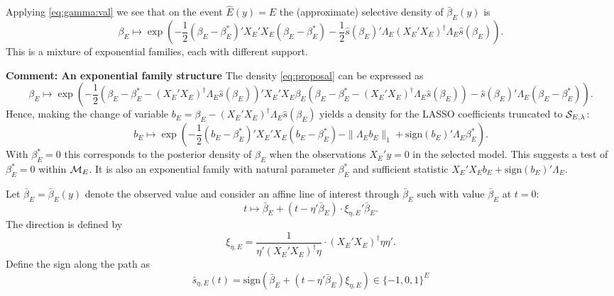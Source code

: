 \documentclass{article}
\newcommand{\OLS}{\bar{\beta}}
\begin{document}
        Applying \eqref{eq:gamma:val} we see that on
        the event $\hat{E}(y)=E$ the (approximate) selective density of
        $\OLS_E(y)$  is
        \begin{equation}
          \label{eq:proposal}
          \beta_E \mapsto \exp\left(-\frac{1}{2} (\beta_E-\beta_E^*)'X_E'X_E(\beta_E-\beta_E^*) - \frac{1}{2}\hat{s}(\beta_E)'\Lambda_E(X_E'X_E)^{\dagger}\Lambda_E\hat{s}(\beta_E)\right).
          \end{equation}
        This is a mixture of exponential families, each with different support. 

        {\bf Comment: An exponential family structure}
        The density \eqref{eq:proposal} can be expressed as
        \begin{equation}
          \label{eq:proposal}
          \beta_E \mapsto \exp\left(-\frac{1}{2} ({\beta}_E - \beta_E^* - (X_E'X_E)^{\dagger}\Lambda_E\hat{s}(\beta_E))'X_E'X_E\beta_E ({\beta}_E - \beta_E^* - (X_E'X_E)^{\dagger}\Lambda_E\hat{s}(\beta_E)) -\hat{s}(\beta_E)'\Lambda_E(\beta_E-\beta_E^*)\right).
          \end{equation}
        Hence, making the change of variable $b_E=\beta_E - (X_E'X_E)^{\dagger}\Lambda_E \hat{s}(\beta_E)$ yields
        a density for the LASSO coefficients truncated to ${\cal S}_{E,\lambda}$:
        \begin{equation}
          \label{eq:exp:family}
          b_E \mapsto \exp\left(-\frac{1}{2} (b_E-\beta_E^*)'X_E'X_E(b_E-\beta_E^*) - \|\Lambda_Eb_E\|_1 + \text{sign}(b_E)'\Lambda_E\beta_E^*\right).
        \end{equation}
          With $\beta_E^*=0$ this
          corresponds to the posterior density of $\beta_E$ when the
          observations $X_E'y=0$ in the selected model.
          This suggests a test of $\beta_E^*=0$ within ${\cal M}_E$. It is also an exponential
          family with natural parameter $\beta_E^*$
          and sufficient statistic $X_E'X_Eb_E + \text{sign}(b_E)'\Lambda_E$. 

        Let $\OLS_E=\OLS_E(y)$ denote the observed value and consider an affine line of interest through
        $\OLS_E$ such with value $\OLS_E$ at $t=0$:
        $$t \mapsto \OLS_E + (t- \eta'\OLS_E) \cdot \xi_{\eta,E}' \OLS_E.$$
        The direction is defined by $$
        \xi_{\eta,E} = \frac{1}{\eta'(X_E'X_E)^{\dagger}\eta} \cdot (X_E'X_E)^{\dagger} \eta \eta'.
        $$ 
        Define the sign along the path as
        $$
        \bar{s}_{\eta,E}(t) = \textrm{sign}\left( \OLS_E + (t - \eta'\OLS_E) \xi_{\eta,E} \right)
        \in \{-1,0,1\}^E
        $$
\end{document}

